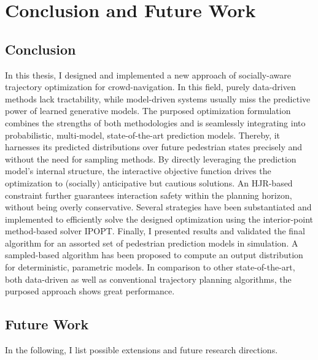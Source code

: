\chapter{Conclusion and Future Work}
\label{text:conclusion}

\section{Conclusion}
\label{text:conclusions/conclusions}
In this thesis, I designed and implemented a new approach of socially-aware trajectory optimization for crowd-navigation. In this field, purely data-driven methods lack tractability, while model-driven systems usually miss the predictive power of learned generative models. The purposed optimization formulation combines the strengths of both methodologies and is seamlessly integrating into probabilistic, multi-model, state-of-the-art prediction models. Thereby, it harnesses its predicted distributions over future pedestrian states precisely and without the need for sampling methods.
\newline\newline
By directly leveraging the prediction model's internal structure, the interactive objective function drives the optimization to (socially) anticipative but cautious solutions. An \ac{HJR}-based constraint further guarantees interaction safety within the planning horizon, without being overly conservative.
\newline\newline
Several strategies have been substantiated and implemented to efficiently solve the designed optimization using the interior-point method-based solver \ac{IPOPT}.
\newline\newline
Finally, I presented results and validated the final algorithm for an assorted set of pedestrian prediction models in simulation. A sampled-based algorithm has been proposed to compute an output distribution for deterministic, parametric models. In comparison to other state-of-the-art, both data-driven as well as conventional trajectory planning algorithms, the purposed approach shows great performance.
\newline

\section{Future Work}
\label{text:conclusions/future_work}
In the following, I list possible extensions and future research directions.

